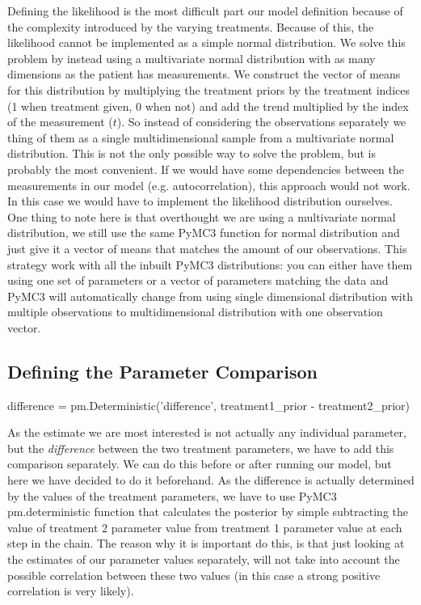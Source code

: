 \documentclass[12pt,a4paper,leqno]{report}
\theoremstyle{plain}
\theoremstyle{definition}
\theoremstyle{remark}
\begin{document}
Defining the likelihood is the most difficult part our model definition because of the
complexity introduced by the varying treatments. Because of this, the likelihood cannot
be implemented as a simple normal distribution. We solve this problem by instead using a
multivariate normal distribution with as many dimensions as the patient has
measurements. We construct the vector of
means for this distribution by multiplying the treatment priors by the treatment indices (1 when
treatment given, 0 when not) and add the trend multiplied by the index of the
measurement (\(t\)). So instead of considering
the observations separately we thing of them as a single multidimensional sample from
a multivariate normal distribution. This is not the only possible way to solve the
problem, but is probably the most convenient. If we would have some
dependencies between the measurements in our model (e.g. autocorrelation), this approach
would not work. In this case we would have to implement the likelihood distribution
ourselves. One thing to note here is that overthought we are using a multivariate normal
distribution, we still use the same PyMC3 function for normal distribution and just give
it a vector of means that matches the amount of our observations. This strategy work
with all the inbuilt PyMC3 distributions: you can either have them using one set of
parameters or a vector of parameters matching the data and PyMC3 will automatically
change from using single dimensional distribution with multiple observations to
multidimensional distribution with one observation vector.

\subsection{Defining the Parameter Comparison}

\bigskip
\begin{pyverbatim}
    difference = pm.Deterministic('difference', treatment1_prior - treatment2_prior)
\end{pyverbatim}
\bigskip

As the estimate we are most interested is not actually any individual parameter, but the
\emph{difference} between the two treatment parameters, we have to add this comparison separately.
We can do this before or after running our model, but here we have decided to do it
beforehand. As the difference is actually determined by the values of the treatment
parameters, we have to use PyMC3 pm.deterministic function that calculates the posterior
by simple subtracting the value of treatment 2 parameter value from treatment 1
parameter value at each step in the chain. The reason why it is important do this, is
that just looking at the estimates of our parameter values separately, will not take
into account the possible correlation between these two values (in this case a strong
positive correlation is very likely).
\end{document}
